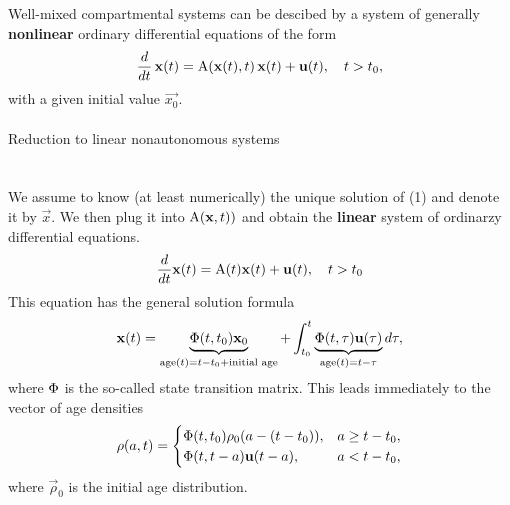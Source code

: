 Well-mixed compartmental systems can be descibed by a system of generally \textbf{nonlinear} 
ordinary differential equations of the form
\vspace{-0.25cm}
\begin{equation}
	\frac{d}{dt}\,\mathbf{x}(t) = \mathbf{\mathrm{A}}(\mathbf{x}(t),t)\,\mathbf{x}(t)+\mathbf{u}(t),\quad t>t_0,
\end{equation}
with a given initial value $\vec{x_0}$.
\\
\vspace{1cm}
\\
{\Large Reduction to linear nonautonomous systems}
\\
\vspace{.5cm}
\\
\\
We assume to know (at least numerically) the unique solution of (1) and denote it by $\vec{x}$.
We then plug it into $\mathbf{\mathrm{A}}(\mathbf{x},t))$ and obtain the {\bf linear} system of ordinarzy differential equations.
\[
\frac{d}{dt} \mathbf{x}(t) = \mathbf{\mathrm{A}}(t)\mathbf{x}(t)+\mathbf{u}(t),\quad t>t_0
\]
This equation has the general solution formula
\[
	\mathbf{x}(t)=\underbrace{\mathbf{\mathrm{\Phi}}(t,t_0)\mathbf{x}_0}_{\text{age}(t)=t-t_0+\text{initial age}}
	+ \int_{t_0}^t \underbrace{\mathbf{\mathrm{\Phi}}(t,\tau)\mathbf{u}(\tau)}_{\text{age}(t)=t-\tau} d\tau,
\]
where $\mathbf{\mathrm{\Phi}}$ is the so-called state transition matrix. This leads immediately to the 
\alert{vector of age densities} 
\[
\mathbf{\rho}(a,t)=
\begin{cases}
	\mathbf{\mathrm{\Phi}}(t,t_0) \mathbf{\rho}_0(a-(t-t_0)),& a \ge t-t_0,
	\\
	\mathbf{\mathrm{\Phi}}(t,t-a) \mathbf{u}(t-a),	& a < t-t_0,
\end{cases}
\]
where $\vec{\rho}_0$ is the initial age distribution.
